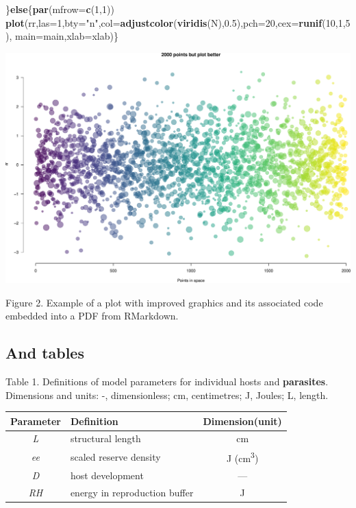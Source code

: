 \documentclass[10,portrait]{article}
\newenvironment{Shaded}{\begin{snugshade}}{\end{snugshade}}
\newcommand{\KeywordTok}[1]{\textcolor[rgb]{0.13,0.29,0.53}{\textbf{#1}}}
\newcommand{\DataTypeTok}[1]{\textcolor[rgb]{0.13,0.29,0.53}{#1}}
\newcommand{\DecValTok}[1]{\textcolor[rgb]{0.00,0.00,0.81}{#1}}
\newcommand{\FloatTok}[1]{\textcolor[rgb]{0.00,0.00,0.81}{#1}}
\newcommand{\StringTok}[1]{\textcolor[rgb]{0.31,0.60,0.02}{#1}}
\newcommand{\ControlFlowTok}[1]{\textcolor[rgb]{0.13,0.29,0.53}{\textbf{#1}}}
\newcommand{\NormalTok}[1]{#1}
\begin{document}
\begin{Shaded}
\begin{Highlighting}[]
\NormalTok{\}}\ControlFlowTok{else}\NormalTok{\{}\KeywordTok{par}\NormalTok{(}\DataTypeTok{mfrow=}\KeywordTok{c}\NormalTok{(}\DecValTok{1}\NormalTok{,}\DecValTok{1}\NormalTok{))}
  \KeywordTok{plot}\NormalTok{(rr,}\DataTypeTok{las=}\DecValTok{1}\NormalTok{,}\DataTypeTok{bty=}\StringTok{"n"}\NormalTok{,}\DataTypeTok{col=}\KeywordTok{adjustcolor}\NormalTok{(}\KeywordTok{viridis}\NormalTok{(N),}\FloatTok{0.5}\NormalTok{),}\DataTypeTok{pch=}\DecValTok{20}\NormalTok{,}\DataTypeTok{cex=}\KeywordTok{runif}\NormalTok{(}\DecValTok{10}\NormalTok{,}\DecValTok{1}\NormalTok{,}\DecValTok{5}\NormalTok{),}
       \DataTypeTok{main=}\NormalTok{main,}\DataTypeTok{xlab=}\NormalTok{xlab)\}}
\end{Highlighting}
\end{Shaded}

\includegraphics{R_is_dope_files/figure-latex/unnamed-chunk-4-1.pdf}

Figure 2. Example of a plot with improved graphics and its associated
code embedded into a PDF from RMarkdown.

\newpage  

\subsection{And tables}\label{and-tables}

Table 1. Definitions of model parameters for individual hosts and
\textbf{parasites}. Dimensions and units: -, dimensionless; cm,
centimetres; J, Joules; L, length.

\begin{longtable}[]{@{}clc@{}}
\toprule
Parameter & Definition & Dimension(unit)\tabularnewline
\midrule
\endhead
\emph{L} & structural length & cm\tabularnewline
\emph{ee} & scaled reserve density & J
(cm\textsuperscript{3})\tabularnewline
\emph{D} & host development & ---\tabularnewline
\emph{RH} & energy in reproduction buffer & J\tabularnewline
\bottomrule
\end{longtable}
\end{document}
